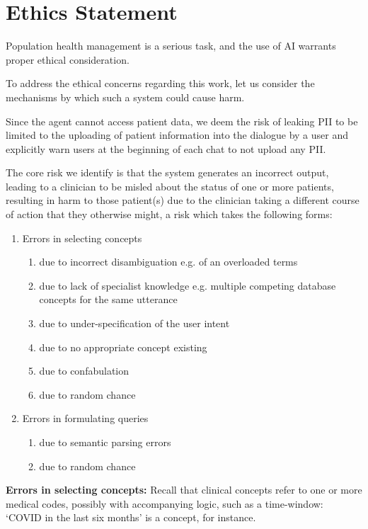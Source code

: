 \documentclass[11pt]{article}
\begin{document}
\section{Ethics Statement}
Population health management is a serious task, and the use of AI warrants proper ethical consideration.

To address the ethical concerns regarding this work, let us consider the mechanisms by which such a system could cause harm.

Since the agent cannot access patient data, we deem the risk of leaking PII to be limited to the uploading of patient information into the dialogue by a user and explicitly warn users at the beginning of each chat to not upload any PII.

The core risk we identify is that the system generates an incorrect output, leading to a clinician to be misled about the status of one or more patients, resulting in harm to those patient(s) due to the clinician taking a different course of action that they otherwise might, a risk which takes the following forms:

\begin{enumerate}
	\item Errors in selecting concepts
	\begin{enumerate}
		\item due to incorrect disambiguation e.g. of an overloaded terms
		\item due to lack of specialist knowledge e.g. multiple competing database concepts for the same utterance   
		\item due to under-specification of the user intent
		\item due to no appropriate concept existing 
		\item due to confabulation
		\item due to random chance
	\end{enumerate}
	\item Errors in formulating queries
	\begin{enumerate}
		\item due to semantic parsing errors 
		\item due to random chance
	\end{enumerate}
\end{enumerate}

\textbf{Errors in selecting concepts:}
Recall that clinical concepts refer to one or more medical codes, possibly with accompanying logic, such as a time-window: `COVID in the last six months' is a concept, for instance.
\end{document}

